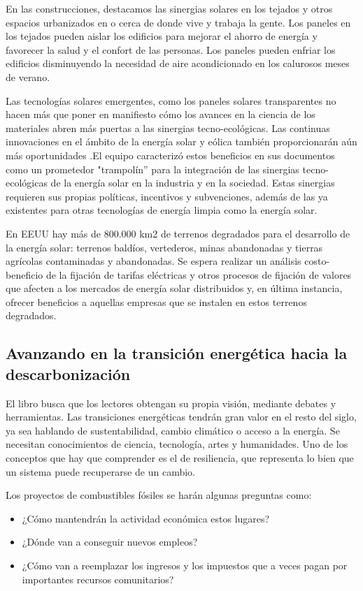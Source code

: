 \documentclass[runningheads]{llncs}
\begin{document}
En las construcciones, destacamos las sinergias solares en los tejados y otros espacios urbanizados en o cerca de donde vive y trabaja la gente. Los paneles en los tejados pueden aislar los edificios para mejorar el ahorro de energía y favorecer la salud y el confort de las personas. Los paneles pueden enfriar los edificios disminuyendo la necesidad de aire acondicionado en los calurosos meses de verano.\\ \par
Las tecnologías solares emergentes, como los paneles solares transparentes no hacen más que poner en manifiesto cómo los avances en la ciencia de los materiales abren más puertas a las sinergias tecno-ecológicas. Las continuas innovaciones en el ámbito de la energía solar y eólica también proporcionarán aún más oportunidades .El equipo caracterizó estos beneficios en sus documentos como un prometedor "trampolín” para la integración de las sinergias tecno-ecológicas de la energía solar en la industria y en la sociedad. Estas sinergias requieren sus propias políticas, incentivos y subvenciones, además de las ya existentes para otras tecnologías de energía limpia como la energía solar.\\ \par
En EEUU hay más de 800.000 km2 de terrenos degradados para el desarrollo de la energía solar: terrenos baldíos, vertederos, minas abandonadas y tierras agrícolas contaminadas y abandonadas. Se espera realizar un análisis costo-beneficio de la fijación de tarifas eléctricas y otros procesos de fijación de valores que afecten a los mercados de energía solar distribuidos y, en última instancia, ofrecer beneficios a aquellas empresas que se instalen en estos terrenos degradados.

\subsection*{Avanzando en la transición energética hacia la descarbonización}
El libro busca que los lectores obtengan su propia visión, mediante debates y herramientas. Las transiciones energéticas tendrán gran valor en el resto del siglo, ya sea hablando de sustentabilidad, cambio climático o acceso a la energía. Se necesitan conocimientos de ciencia, tecnología, artes y humanidades. Uno de los conceptos que hay que comprender es el de resiliencia, que representa lo bien que un sistema puede recuperarse de un cambio.\\ \par
Los proyectos de combustibles fósiles se harán algunas preguntas como:
\begin{itemize}

\item ¿Cómo mantendrán la actividad económica estos lugares?
\item ¿Dónde van a conseguir nuevos empleos? 
\item ¿Cómo van a reemplazar los ingresos y los impuestos que a veces pagan por importantes recursos comunitarios?

\end{itemize}
\end{document}
